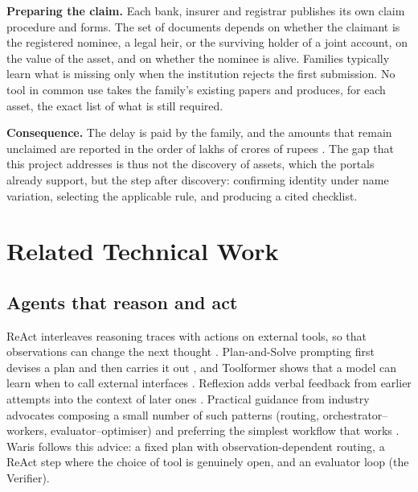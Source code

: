 \documentclass[12pt,a4paper,oneside]{report}
\begin{document}
\textbf{Preparing the claim.} Each bank, insurer and registrar publishes its own claim procedure and forms. The set of documents depends on whether the claimant is the registered nominee, a legal heir, or the surviving holder of a joint account, on the value of the asset, and on whether the nominee is alive. Families typically learn what is missing only when the institution rejects the first submission. No tool in common use takes the family's existing papers and produces, for each asset, the exact list of what is still required.

\textbf{Consequence.} The delay is paid by the family, and the amounts that remain unclaimed are reported in the order of lakhs of crores of rupees \cite{lapaas2026,bt2026}. The gap that this project addresses is thus not the discovery of assets, which the portals already support, but the step after discovery: confirming identity under name variation, selecting the applicable rule, and producing a cited checklist.

\section{Related Technical Work}

\subsection{Agents that reason and act}
ReAct interleaves reasoning traces with actions on external tools, so that observations can change the next thought \cite{yao2023react}. Plan-and-Solve prompting first devises a plan and then carries it out \cite{wang2023plansolve}, and Toolformer shows that a model can learn when to call external interfaces \cite{schick2023toolformer}. Reflexion adds verbal feedback from earlier attempts into the context of later ones \cite{shinn2023reflexion}. Practical guidance from industry advocates composing a small number of such patterns (routing, orchestrator--workers, evaluator--optimiser) and preferring the simplest workflow that works \cite{anthropic2024agents}. Waris follows this advice: a fixed plan with observation-dependent routing, a ReAct step where the choice of tool is genuinely open, and an evaluator loop (the Verifier).
\end{document}
